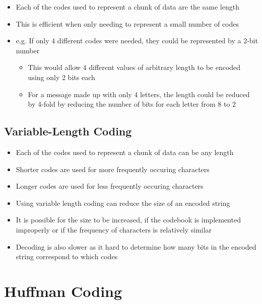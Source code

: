 \begin{itemize}
  \item Each of the codes used to represent a chunk of data are the same length
  \item This is efficient when only needing to represent a small number of codes
  \item e.g. If only 4 different codes were needed, they could be represented by a 2-bit number
  \begin{itemize}
    \item This would allow 4 different values of arbitrary length to be encoded using only 2 bits each
    \item For a message made up with only 4 letters, the length could be reduced by 4-fold by reducing the number of bits for each letter from 8 to 2
  \end{itemize}
\end{itemize}

\subsection*{Variable-Length Coding}

\begin{itemize}
  \item Each of the codes used to represent a chunk of data can be any length
  \item Shorter codes are used for more frequently occuring characters
  \item Longer codes are used for less frequently occuring characters
  \item Using variable length coding can reduce the size of an encoded string
  \item It is possible for the size to be increased, if the codebook is implemented improperly or if the frequency of characters is relatively similar
  \item Decoding is also slower as it hard to determine how many bits in the encoded string correspond to which codes
\end{itemize}

\section*{Huffman Coding}

